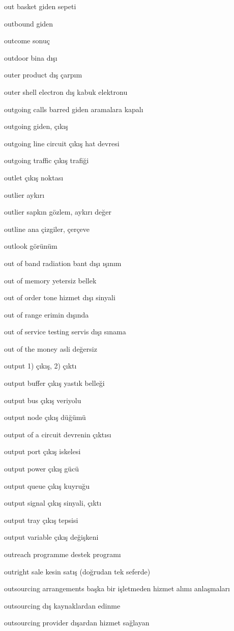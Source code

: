 \documentclass[12pt,fleqn]{article}\usepackage{../../common}
\begin{document}
out basket giden sepeti

outbound giden

outcome sonuç

outdoor bina dışı

outer product dış çarpım

outer shell electron dış kabuk elektronu

outgoing calls barred giden aramalara kapalı

outgoing giden, çıkış

outgoing line circuit çıkış hat devresi

outgoing traffic çıkış trafiği

outlet çıkış noktası

outlier aykırı

outlier sapkın gözlem, aykırı değer

outline ana çizgiler, çerçeve

outlook görünüm

out of band radiation bant dışı ışınım

out of memory yetersiz bellek

out of order tone hizmet dışı sinyali

out of range erimin dışında

out of service testing servis dışı sınama

out of the money asli değersiz

output 1) çıkış, 2) çıktı

output buffer çıkış yastık belleği

output bus çıkış veriyolu

output node çıkış düğümü

output of a circuit devrenin çıktısı

output port çıkış iskelesi

output power çıkış gücü

output queue çıkış kuyruğu

output signal çıkış sinyali, çıktı

output tray çıkış tepsisi

output variable çıkış değişkeni

outreach programme destek programı

outright sale kesin satış (doğrudan tek seferde)

outsourcing arrangements başka bir işletmeden hizmet alımı anlaşmaları

outsourcing dış kaynaklardan edinme

outsourcing provider dışardan hizmet sağlayan
\end{document}
